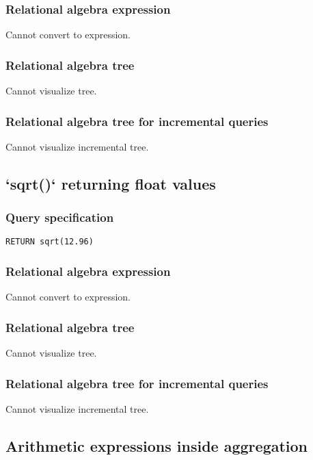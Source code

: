 \subsubsection*{Relational algebra expression}

Cannot convert to expression.

\subsubsection*{Relational algebra tree}

Cannot visualize tree.

\subsubsection*{Relational algebra tree for incremental queries}

Cannot visualize incremental tree.

\subsection{`sqrt()` returning float values}

\subsubsection*{Query specification}

\begin{lstlisting}
RETURN sqrt(12.96)
\end{lstlisting}

\subsubsection*{Relational algebra expression}

Cannot convert to expression.

\subsubsection*{Relational algebra tree}

Cannot visualize tree.

\subsubsection*{Relational algebra tree for incremental queries}

Cannot visualize incremental tree.

\subsection{Arithmetic expressions inside aggregation}

